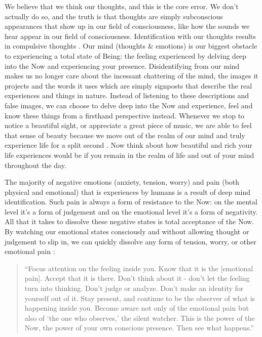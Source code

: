 \documentclass[
]{book}
\begin{document}
We believe that we think our thoughts, and this is the core error. We don't actually do so, and the truth is that thoughts are simply subconscious appearances that show up in our field of consciousness, like how the sounds we hear appear in our field of consciousness. Identification with our thoughts results in compulsive thoughts \citep{thoughts}. Our mind (thoughts \& emotions) is our biggest obstacle to experiencing a total state of Being: the feeling experienced by delving deep into the Now and experiencing your presence. Disidentifying from our mind makes us no longer care about the incessant chattering of the mind, the images it projects and the words it uses which are simply signposts that describe the real experiences and things in nature. Instead of listening to these descriptions and false images, we can choose to delve deep into the Now and experience, feel and know these things from a firsthand perspective instead. Whenever we stop to notice a beautiful sight, or appreciate a great piece of music, we are able to feel that sense of beauty because we move out of the realm of our mind and truly experience life for a split second \citep{beauty}. Now think about how beautiful and rich your life experiences would be if you remain in the realm of life and out of your mind throughout the day.

The majority of negative emotions (anxiety, tension, worry) and pain (both physical and emotional) that is experiences by humans is a result of deep mind identification. Such pain is always a form of resistance to the Now: on the mental level it's a form of judgement and on the emotional level it's a form of negativity. All that it takes to dissolve these negative states is total acceptance of the Now. By watching our emotional states consciously and without allowing thought or judgement to slip in, we can quickly dissolve any form of tension, worry, or other emotional pain \citep{emotions}:

\begin{quote}
``Focus attention on the feeling inside you. Know that
it is the {[}emotional pain{]}. Accept that it is there. Don't think about it - don't let the feeling
turn into thinking. Don't judge or analyze. Don't make an identity for yourself out of
it. Stay present, and continue to be the observer of what is happening inside you.
Become aware not only of the emotional pain but also of `the one who observes,' the
silent watcher. This is the power of the Now, the power of your own conscious
presence. Then see what happens.'' \citep{quote2}
\end{quote}
\end{document}
